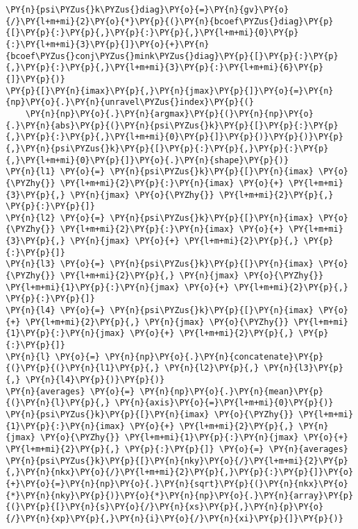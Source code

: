 \begin{Verbatim}[commandchars=\\\{\}]
\PY{n}{psi\PYZus{}k\PYZus{}diag}\PY{o}{=}\PY{n}{gv}\PY{o}{/}\PY{l+m+mi}{2}\PY{o}{*}\PY{p}{(}\PY{n}{bcoef\PYZus{}diag}\PY{p}{[}\PY{p}{:}\PY{p}{,}\PY{p}{:}\PY{p}{,}\PY{l+m+mi}{0}\PY{p}{:}\PY{l+m+mi}{3}\PY{p}{]}\PY{o}{+}\PY{n}{bcoef\PYZus{}conj\PYZus{}mink\PYZus{}diag}\PY{p}{[}\PY{p}{:}\PY{p}{,}\PY{p}{:}\PY{p}{,}\PY{l+m+mi}{3}\PY{p}{:}\PY{l+m+mi}{6}\PY{p}{]}\PY{p}{)}
\PY{p}{[}\PY{n}{imax}\PY{p}{,}\PY{n}{jmax}\PY{p}{]}\PY{o}{=}\PY{n}{np}\PY{o}{.}\PY{n}{unravel\PYZus{}index}\PY{p}{(}
    \PY{n}{np}\PY{o}{.}\PY{n}{argmax}\PY{p}{(}\PY{n}{np}\PY{o}{.}\PY{n}{abs}\PY{p}{(}\PY{n}{psi\PYZus{}k}\PY{p}{[}\PY{p}{:}\PY{p}{,}\PY{p}{:}\PY{p}{,}\PY{l+m+mi}{0}\PY{p}{]}\PY{p}{)}\PY{p}{)}\PY{p}{,}\PY{n}{psi\PYZus{}k}\PY{p}{[}\PY{p}{:}\PY{p}{,}\PY{p}{:}\PY{p}{,}\PY{l+m+mi}{0}\PY{p}{]}\PY{o}{.}\PY{n}{shape}\PY{p}{)}
\PY{n}{l1} \PY{o}{=} \PY{n}{psi\PYZus{}k}\PY{p}{[}\PY{n}{imax} \PY{o}{\PYZhy{}} \PY{l+m+mi}{2}\PY{p}{:}\PY{n}{imax} \PY{o}{+} \PY{l+m+mi}{3}\PY{p}{,} \PY{n}{jmax} \PY{o}{\PYZhy{}} \PY{l+m+mi}{2}\PY{p}{,} \PY{p}{:}\PY{p}{]}
\PY{n}{l2} \PY{o}{=} \PY{n}{psi\PYZus{}k}\PY{p}{[}\PY{n}{imax} \PY{o}{\PYZhy{}} \PY{l+m+mi}{2}\PY{p}{:}\PY{n}{imax} \PY{o}{+} \PY{l+m+mi}{3}\PY{p}{,} \PY{n}{jmax} \PY{o}{+} \PY{l+m+mi}{2}\PY{p}{,} \PY{p}{:}\PY{p}{]}
\PY{n}{l3} \PY{o}{=} \PY{n}{psi\PYZus{}k}\PY{p}{[}\PY{n}{imax} \PY{o}{\PYZhy{}} \PY{l+m+mi}{2}\PY{p}{,} \PY{n}{jmax} \PY{o}{\PYZhy{}} \PY{l+m+mi}{1}\PY{p}{:}\PY{n}{jmax} \PY{o}{+} \PY{l+m+mi}{2}\PY{p}{,} \PY{p}{:}\PY{p}{]}
\PY{n}{l4} \PY{o}{=} \PY{n}{psi\PYZus{}k}\PY{p}{[}\PY{n}{imax} \PY{o}{+} \PY{l+m+mi}{2}\PY{p}{,} \PY{n}{jmax} \PY{o}{\PYZhy{}} \PY{l+m+mi}{1}\PY{p}{:}\PY{n}{jmax} \PY{o}{+} \PY{l+m+mi}{2}\PY{p}{,} \PY{p}{:}\PY{p}{]}
\PY{n}{l} \PY{o}{=} \PY{n}{np}\PY{o}{.}\PY{n}{concatenate}\PY{p}{(}\PY{p}{(}\PY{n}{l1}\PY{p}{,} \PY{n}{l2}\PY{p}{,} \PY{n}{l3}\PY{p}{,} \PY{n}{l4}\PY{p}{)}\PY{p}{)}
\PY{n}{averages} \PY{o}{=} \PY{n}{np}\PY{o}{.}\PY{n}{mean}\PY{p}{(}\PY{n}{l}\PY{p}{,} \PY{n}{axis}\PY{o}{=}\PY{l+m+mi}{0}\PY{p}{)}
\PY{n}{psi\PYZus{}k}\PY{p}{[}\PY{n}{imax} \PY{o}{\PYZhy{}} \PY{l+m+mi}{1}\PY{p}{:}\PY{n}{imax} \PY{o}{+} \PY{l+m+mi}{2}\PY{p}{,} \PY{n}{jmax} \PY{o}{\PYZhy{}} \PY{l+m+mi}{1}\PY{p}{:}\PY{n}{jmax} \PY{o}{+} \PY{l+m+mi}{2}\PY{p}{,} \PY{p}{:}\PY{p}{]} \PY{o}{=} \PY{n}{averages}
\PY{n}{psi\PYZus{}k}\PY{p}{[}\PY{n}{nky}\PY{o}{/}\PY{l+m+mi}{2}\PY{p}{,}\PY{n}{nkx}\PY{o}{/}\PY{l+m+mi}{2}\PY{p}{,}\PY{p}{:}\PY{p}{]}\PY{o}{+}\PY{o}{=}\PY{n}{np}\PY{o}{.}\PY{n}{sqrt}\PY{p}{(}\PY{n}{nkx}\PY{o}{*}\PY{n}{nky}\PY{p}{)}\PY{o}{*}\PY{n}{np}\PY{o}{.}\PY{n}{array}\PY{p}{(}\PY{p}{[}\PY{n}{s}\PY{o}{/}\PY{n}{xs}\PY{p}{,}\PY{n}{p}\PY{o}{/}\PY{n}{xp}\PY{p}{,}\PY{n}{i}\PY{o}{/}\PY{n}{xi}\PY{p}{]}\PY{p}{)}

\end{Verbatim}
